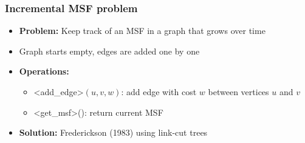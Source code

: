 \documentclass[fleqn]{beamer}
\def\texttt#1{<#1>}%
\begin{document}
\begin{frame}
    \frametitle{Incremental MSF problem}
    
    \begin{itemize}
    \item \textbf{Problem:} Keep track of an MSF in a graph that grows over time \vfill
    \item Graph starts empty, edges are added one by one \vfill\pause
    \item \textbf{Operations:}
        \begin{itemize}
        \item \texttt{add\_edge}$(u,v,w)$: add edge with cost $w$ between vertices $u$ and $v$
        \item \texttt{get\_msf}(): return current MSF
        \end{itemize} \vfill\pause
    \item \textbf{Solution:} Frederickson (1983) using link-cut trees \vfill
    \end{itemize}
\end{frame}
\end{document}
